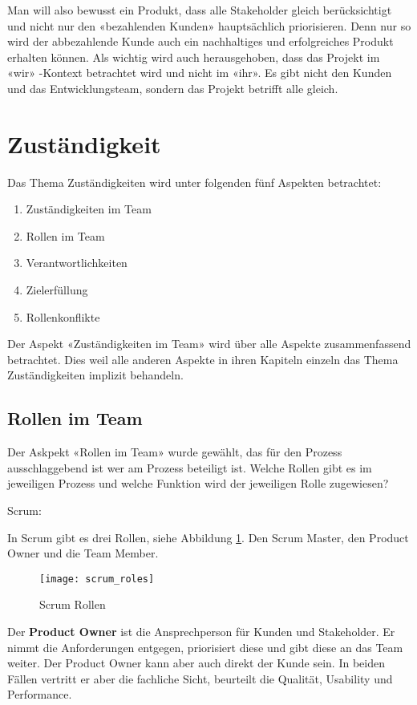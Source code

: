 Man will also bewusst ein Produkt, dass alle Stakeholder gleich berücksichtigt und nicht nur den «bezahlenden Kunden» hauptsächlich priorisieren. Denn nur so wird der abbezahlende Kunde auch ein nachhaltiges und erfolgreiches Produkt erhalten können.
\medskip
Als wichtig wird auch herausgehoben, dass das Projekt im «wir»	-Kontext betrachtet wird und nicht im «ihr». Es gibt nicht den Kunden und das Entwicklungsteam, sondern das Projekt betrifft alle gleich.


\section{Zuständigkeit}

Das Thema Zuständigkeiten wird unter folgenden fünf Aspekten betrachtet:
\begin{enumerate}
\item Zuständigkeiten im Team
\item Rollen im Team
\item Verantwortlichkeiten
\item Zielerfüllung
\item Rollenkonflikte
\end{enumerate}

Der Aspekt «Zuständigkeiten im Team» wird über alle Aspekte zusammenfassend betrachtet. Dies weil alle anderen Aspekte in ihren Kapiteln einzeln das Thema Zuständigkeiten implizit behandeln.

\subsection{Rollen im Team}

Der Askpekt «Rollen im Team» wurde gewählt, das für den Prozess ausschlaggebend ist wer am Prozess beteiligt ist. Welche Rollen gibt es im jeweiligen Prozess und welche Funktion wird der jeweiligen Rolle zugewiesen?

{\Large Scrum:} \cite{scrumRoles} \medskip

In Scrum gibt es drei Rollen, siehe Abbildung \ref{fig:scrumrollen}. Den Scrum Master, den Product Owner und die Team Member. 
\begin{figure}[H]
	\centering
	\texttt{[image: scrum\_roles]}
	\caption{Scrum Rollen \cite{scrumRoles}}
	\label{fig:scrumrollen}
\end{figure}

Der \textbf{Product Owner} ist die Ansprechperson für Kunden und Stakeholder. Er nimmt die Anforderungen entgegen, priorisiert diese und gibt diese an das Team weiter. Der Product Owner kann aber auch direkt der Kunde sein. In beiden Fällen vertritt er aber die fachliche Sicht, beurteilt die Qualität, Usability und Performance. \medskip

